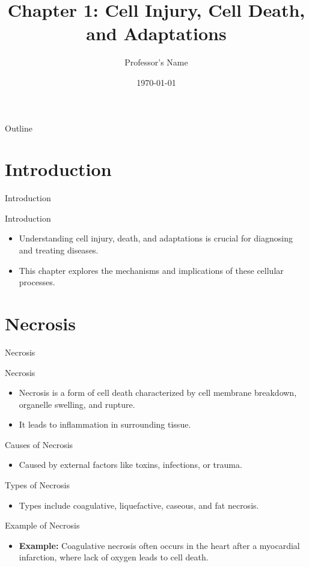 \documentclass{beamer}
\title{Chapter 1: Cell Injury, Cell Death, and Adaptations}
\author{Professor's Name}
\date{\today}
\begin{document}
	
	\begin{frame}
		\titlepage
	\end{frame}
	
	\begin{frame}{Outline}
		\tableofcontents
	\end{frame}
	
	\section{Introduction}
	\begin{frame}{Introduction}
	\end{frame}
	\begin{frame}{Introduction}
		\begin{itemize}
			\item Understanding cell injury, death, and adaptations is crucial for diagnosing and treating diseases.
			\item This chapter explores the mechanisms and implications of these cellular processes.
		\end{itemize}
	\end{frame}
	
	\section{Necrosis}
	\begin{frame}{Necrosis}
	\end{frame}
	\begin{frame}{Necrosis}
		\begin{itemize}
			\item Necrosis is a form of cell death characterized by cell membrane breakdown, organelle swelling, and rupture.
			\item It leads to inflammation in surrounding tissue.
		\end{itemize}
	\end{frame}
	\begin{frame}{Causes of Necrosis}
		\begin{itemize}
			\item Caused by external factors like toxins, infections, or trauma.
		\end{itemize}
	\end{frame}
	\begin{frame}{Types of Necrosis}
		\begin{itemize}
			\item Types include coagulative, liquefactive, caseous, and fat necrosis.
		\end{itemize}
	\end{frame}
	\begin{frame}{Example of Necrosis}
		\begin{itemize}
			\item \textbf{Example:} Coagulative necrosis often occurs in the heart after a myocardial infarction, where lack of oxygen leads to cell death.
		\end{itemize}
	\end{frame}
	
\end{document}
